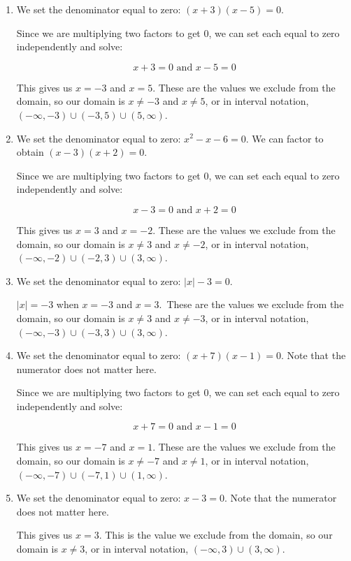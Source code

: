 \documentclass{ximera}
\begin{document}
\begin{explanation}
\begin{enumerate}
	\item We set the denominator equal to zero: $(x + 3)(x - 5) = 0$. 

Since we are multiplying two factors to get 0, we can set each equal to zero independently and solve: 

$$x + 3 = 0 \text{ and } x - 5 = 0$$

This gives us $x = -3$ and $x = 5$. These are the values we exclude from the domain, so our domain is $x \ne -3$ and $x \ne 5$, or in interval notation, $(-\infty, -3) \cup (-3, 5) \cup (5, \infty)$. 

	\item We set the denominator equal to zero: $x^2 - x - 6 = 0$. We can factor to obtain $(x - 3)(x + 2) = 0$. 

Since we are multiplying two factors to get 0, we can set each equal to zero independently and solve: 

$$x - 3 = 0 \text{ and } x + 2 = 0$$

This gives us $x = 3$ and $x = -2$. These are the values we exclude from the domain, so our domain is $x \ne 3$ and $x \ne -2$, or in interval notation, $(-\infty, -2) \cup (-2, 3) \cup (3, \infty)$. 

	\item We set the denominator equal to zero: $|x| - 3 = 0$.

$|x| = -3$ when $x = -3$ and $x = 3$. These are the values we exclude from the domain, so our domain is $x \ne 3$ and $x \ne -3$, or in interval notation, $(-\infty, -3) \cup (-3, 3) \cup (3, \infty)$. 

	\item We set the denominator equal to zero: $(x + 7)(x - 1) = 0$. Note that the numerator does not matter here. 

Since we are multiplying two factors to get 0, we can set each equal to zero independently and solve: 

$$x + 7 = 0 \text{ and } x - 1 = 0$$

This gives us $x = -7$ and $x = 1$. These are the values we exclude from the domain, so our domain is $x \ne -7$ and $x \ne 1$, or in interval notation, $(-\infty, -7) \cup (-7, 1) \cup (1, \infty)$. 

	\item We set the denominator equal to zero: $x - 3 = 0$. Note that the numerator does not matter here. 

This gives us $x = 3$. This is the value we exclude from the domain, so our domain is $x \ne 3$, or in interval notation, $(-\infty, 3) \cup (3, \infty)$. 
\end{enumerate}
\end{explanation}

\end{document}
